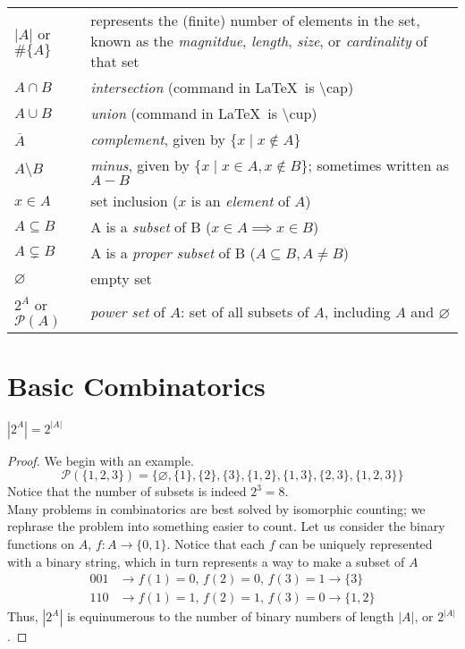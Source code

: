 \begin{tabular}{p{1in} p{10cm}}
    $|A|$ or $\#\{A\}$ &  represents the (finite) number of elements in the set, known as the \emph{magnitdue}, \emph{length}, \emph{size}, or \emph{cardinality} of that set\\
    $A \cap B$ & \emph{intersection} (command in \LaTeX\ is \textbackslash cap) \\
    $A \cup B$ & \emph{union} (command in \LaTeX\ is \textbackslash cup) \\
    $\overline{A}$ & \emph{complement}, given by $\{x \mid x \not\in A\}$ \\
    $A \setminus B$ & \emph{minus}, given by $\{x \mid x \in A, x \not\in B\}$; sometimes written as $A-B$ \\
    $x\in A$ & set inclusion ($x$ is an \emph{element} of $A$) \\
    $A \subseteq B$ & A is a \emph{subset} of B ($x\in A \implies x \in B$) \\
    $A \subsetneq B$ & A is a \emph{proper subset} of B ($A\subseteq B, A\neq B$) \\
    $\varnothing$ & empty set \\
    $2^A$ or $\mathcal{P}(A)$ & \emph{power set} of $A$: set of all subsets of $A$, including $A$ and $\varnothing$
\end{tabular}

\section{Basic Combinatorics}
\begin{theorem}
$|2^A|=2^{|A|}$
\end{theorem}
\begin{proof} 
We begin with an example.
$$\mathcal{P}(\{1, 2, 3\}) = \{\varnothing, \{1\}, \{2\}, \{3\}, \{1, 2\}, \{1, 3\}, \{2, 3\}, \{1, 2, 3\}\}$$
Notice that the number of subsets is indeed $2^3 = 8$. \\
Many problems in combinatorics are best solved by isomorphic counting; we rephrase the problem into something easier to count. Let us consider the binary functions on $A$,  $f: A \rightarrow \{0, 1\}$. Notice that each $f$ can be uniquely represented with a binary string, which in turn represents a way to make a subset of $A$
\begin{align*}
    001 &\rightarrow f(1) = 0,\, f(2) = 0,\, f(3) = 1 \rightarrow \{3\}\\
    110 &\rightarrow f(1) = 1,\, f(2) = 1,\, f(3) = 0 \rightarrow \{1, 2\}
\end{align*}
Thus, $|2^A|$ is equinumerous to the number of binary numbers of length $|A|$, or $2^{|A|}$.
\end{proof}

